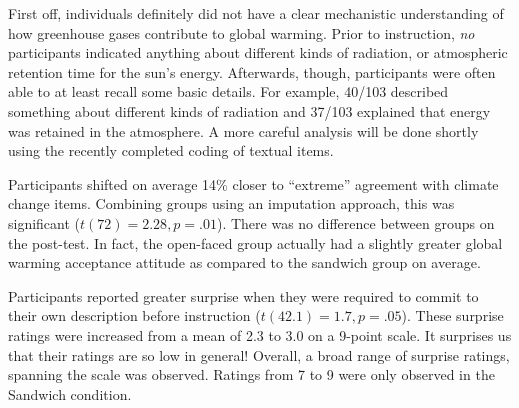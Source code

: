 First off, individuals definitely did not have a clear mechanistic understanding
of how greenhouse gases contribute to global warming. Prior to instruction,
\emph{no} participants indicated anything about different kinds of radiation, or
atmospheric retention time for the sun's energy. Afterwards, though,
participants were often able to at least recall some basic details. For example,
40/103 described something about different kinds of radiation and 37/103
explained that energy was retained in the atmosphere. A more careful analysis
will be done shortly using the recently completed coding of textual items.

Participants shifted on average 14\% closer to ``extreme'' agreement with climate
change items. Combining groups using an imputation approach, this was
significant ($t(72)=2.28, p=.01$). There was no difference between groups on the post-test. In fact, the open-faced
group actually had a slightly greater global warming acceptance
attitude as compared to the sandwich group on average. 

Participants reported greater surprise when they were required to commit to
their own description before instruction ($t(42.1)=1.7, p=.05$). These surprise
ratings were increased from a mean of 2.3 to 3.0 on a 9-point scale. It
surprises us that their ratings are so low in general! Overall, a broad range of
surprise ratings, spanning the scale was observed. Ratings from 7 to 9 were only
observed in the Sandwich condition.


